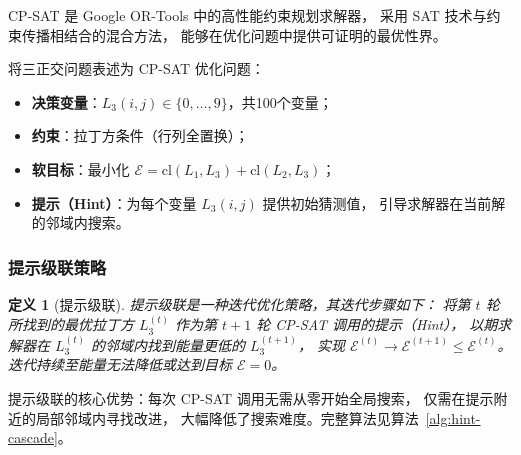 \documentclass[11pt,a4paper]{ctexart}
\newtheorem{definition}[theorem]{定义}
\theoremstyle{remark}
\newcommand{\cl}{\mathrm{cl}}
\newcommand{\E}{\mathcal{E}}
\begin{document}
CP-SAT 是 Google OR-Tools \cite{ortools} 中的高性能约束规划求解器，
采用 SAT 技术与约束传播相结合的混合方法，
能够在优化问题中提供可证明的最优性界。

将三正交问题表述为 CP-SAT 优化问题：
\begin{itemize}
  \item \textbf{决策变量}：$L_3(i,j) \in \{0, \ldots, 9\}$，共100个变量；
  \item \textbf{约束}：拉丁方条件（行列全置换）；
  \item \textbf{软目标}：最小化 $\E = \cl(L_1, L_3) + \cl(L_2, L_3)$；
  \item \textbf{提示（Hint）}：为每个变量 $L_3(i,j)$ 提供初始猜测值，
    引导求解器在当前解的邻域内搜索。
\end{itemize}

\subsubsection{提示级联策略}

\begin{definition}[提示级联]
  \label{def:hint-cascade}
  提示级联是一种迭代优化策略，其迭代步骤如下：
  将第 $t$ 轮所找到的最优拉丁方 $L_3^{(t)}$ 作为第 $t+1$ 轮 CP-SAT 调用的提示（Hint），
  以期求解器在 $L_3^{(t)}$ 的邻域内找到能量更低的 $L_3^{(t+1)}$，
  实现 $\E^{(t)} \to \E^{(t+1)} \le \E^{(t)}$。
  迭代持续至能量无法降低或达到目标 $\E = 0$。
\end{definition}

提示级联的核心优势：每次 CP-SAT 调用无需从零开始全局搜索，
仅需在提示附近的局部邻域内寻找改进，
大幅降低了搜索难度。完整算法见算法~\ref{alg:hint-cascade}。
\end{document}
